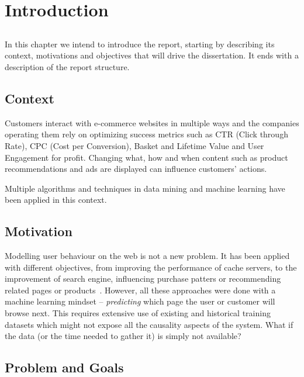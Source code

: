 \chapter{Introduction} \label{chap:intro}

\section*{}

In this chapter we intend to introduce the report, starting by describing its 
context, motivations and objectives that will drive the dissertation. It ends 
with a description of the report structure.

\section{Context} \label{sec:context}

Customers interact with e-commerce websites in multiple ways and the companies
operating them rely on optimizing success metrics such as CTR (Click
through Rate), CPC (Cost per Conversion), Basket and Lifetime Value and User
Engagement for profit. Changing what, how and when content such as product
recommendations and ads are displayed can influence customers' actions.

Multiple algorithms and techniques in data mining and machine learning
have been applied in this context.

\section{Motivation} \label{sec:motiv}

Modelling user behaviour on the web is not a new problem. It has been applied 
with different objectives, from improving the performance of cache 
servers, to the improvement of search engine, influencing purchase patters or 
recommending related pages or products~\cite{Deshpande2001, 
JSrivastavaRCooley2000}. However, all these approaches were done with a machine 
learning mindset -- \textit{predicting} which page the user or customer will 
browse next. This requires extensive use of existing and historical training 
datasets which might not expose all the causality aspects of the system. What 
if the data (or the time needed to gather it) is simply not available?

\section{Problem and Goals} \label{sec:problem}

